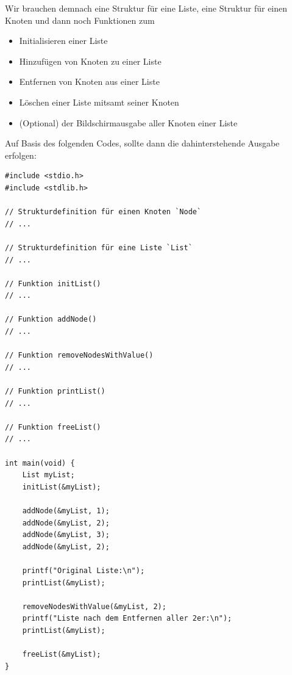 \begin{figure}[htb!]
\end{figure}

Wir brauchen demnach eine Struktur für eine Liste, eine Struktur für einen
Knoten und dann noch Funktionen zum
\begin{itemize}
    \item Initialisieren einer Liste
    \item Hinzufügen von Knoten zu einer Liste
    \item Entfernen von Knoten aus einer Liste
    \item Löschen einer Liste mitsamt seiner Knoten
    \item (Optional) der Bildschirmausgabe aller Knoten einer Liste
\end{itemize}

Auf Basis des folgenden Codes, sollte dann die dahinterstehende Ausgabe
erfolgen:

\begin{verbatim}
#include <stdio.h>
#include <stdlib.h>

// Strukturdefinition für einen Knoten `Node`
// ...

// Strukturdefinition für eine Liste `List`
// ...

// Funktion initList()
// ...

// Funktion addNode()
// ...

// Funktion removeNodesWithValue()
// ...

// Funktion printList()
// ...

// Funktion freeList()
// ...

int main(void) {
    List myList;
    initList(&myList);

    addNode(&myList, 1);
    addNode(&myList, 2);
    addNode(&myList, 3);
    addNode(&myList, 2);

    printf("Original Liste:\n");
    printList(&myList);

    removeNodesWithValue(&myList, 2);
    printf("Liste nach dem Entfernen aller 2er:\n");
    printList(&myList);

    freeList(&myList);
}
\end{verbatim}

